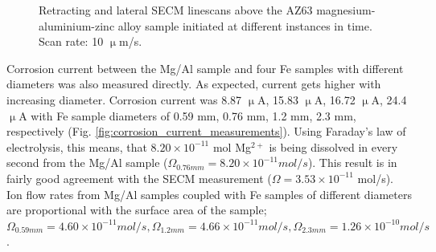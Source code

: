 \begin{figure}
\caption[Retracting and lateral SECM linescans above the AZ63 sample initiated at different instances in time.]{Retracting and lateral SECM linescans above the AZ63 magnesium-aluminium-zinc alloy sample initiated at different instances in time.
Scan rate: 10 $\upmu$m/s.}
\label{fig:retracting}
\end{figure}

Corrosion current between the Mg/Al sample and four Fe samples with different diameters was also measured directly.
As expected, current gets higher with increasing diameter.
Corrosion current was 8.87 $\upmu$A, 15.83 $\upmu$A, 16.72 $\upmu$A, 24.4 $\upmu$A with Fe sample diameters of 0.59 mm, 0.76 mm, 1.2 mm, 2.3 mm, respectively (Fig. \ref{fig:corrosion_current_measurements}).
Using Faraday's law of electrolysis, this means, that $8.20\times10^{-11}$ mol Mg$^{2+}$ is being dissolved in every second from the Mg/Al sample ($\Omega_{0.76mm} = 8.20\times10^{-11} mol/s$).
This result is in fairly good agreement with the SECM measurement ($\Omega = 3.53\times10^{-11}$ mol/s).
Ion flow rates from Mg/Al samples coupled with Fe samples of different diameters are proportional with the surface area of the sample; $\Omega_{0.59mm} = 4.60\times10^{-11} mol/s, \Omega_{1.2mm} = 4.66\times10^{-11} mol/s, \Omega_{2.3mm} = 1.26\times10^{-10} mol/s$.

